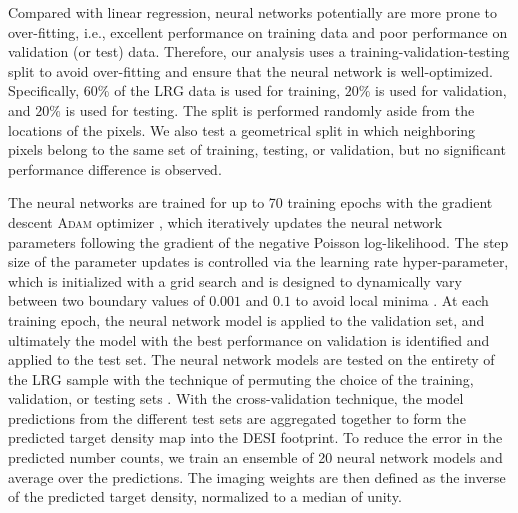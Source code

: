 Compared with linear regression, neural networks potentially are more prone to over-fitting, i.e., excellent performance on training data and poor performance on validation (or test) data. Therefore, our analysis uses a training-validation-testing split to avoid over-fitting and ensure that the neural network is well-optimized. Specifically, $60\%$ of the LRG data is used for training, $20\%$ is used for validation, and $20\%$ is used for testing. The split is performed randomly aside from the locations of the pixels. We also test a geometrical split in which neighboring pixels belong to the same set of training, testing, or validation, but no significant performance difference is observed.

The neural networks are trained for up to 70 training epochs with the gradient descent \textsc{Adam} optimizer \citep{2017arXiv171105101L}, which iteratively updates the neural network parameters following the gradient of the negative Poisson log-likelihood. The step size of the parameter updates is controlled via the learning rate hyper-parameter, which is initialized with a grid search and is designed to dynamically vary between two boundary values of $0.001$ and $0.1$ to avoid local minima \citep[see again,][]{2016arXiv160803983L}. At each training epoch, the neural network model is applied to the validation set, and ultimately the model with the best performance on validation is identified and applied to the test set. The neural network models are tested on the entirety of the LRG sample with the technique of permuting the choice of the training, validation, or testing sets \citep{arlot2010survey}. With the cross-validation technique, the model predictions from the different test sets are aggregated together to form the predicted target density map into the DESI footprint. To reduce the error in the predicted number counts, we train an ensemble of 20 neural network models and average over the predictions. The imaging weights are then defined as the inverse of the predicted target density, normalized to a median of unity.



